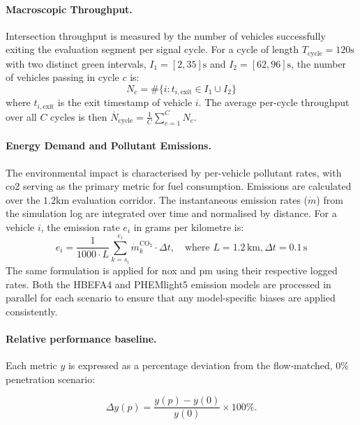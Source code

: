 \paragraph{Macroscopic Throughput.}
Intersection throughput is measured by the number of vehicles successfully exiting the evaluation segment per signal cycle. For a cycle of length $T_{\mathrm{cycle}}=120\unit{\second}$ with two distinct green intervals, $I_{1}=[2,35]\unit{\second}$ and $I_{2}=[62,96]\unit{\second}$, the number of vehicles passing in cycle $c$ is:
\begin{equation}
    N_{c} = \#\lbrace i : t_{i,\mathrm{exit}} \in I_{1} \cup I_{2} \rbrace
\end{equation}
where $t_{i,\mathrm{exit}}$ is the exit timestamp of vehicle $i$. The average per-cycle throughput over all $C$ cycles is then $\overline{N}_{\mathrm{cycle}} = \frac{1}{C}\sum_{c=1}^{C} N_{c}$.

\paragraph{Energy Demand and Pollutant Emissions.}
The environmental impact is characterised by per-vehicle pollutant rates, with \ac{co2} serving as the primary metric for fuel consumption. Emissions are calculated over the $1.2\unit{\kilo\meter}$ evaluation corridor. The instantaneous emission rates ($\dot{m}$) from the simulation log are integrated over time and normalised by distance. For a vehicle $i$, the emission rate $e_i$ in grams per kilometre is:
\begin{equation}
    e_{i} = \frac{1}{1000 \cdot L} \sum_{k=s_i}^{e_i} \dot{m}^{\mathrm{CO_2}}_{k} \cdot \Delta t, \quad \text{where } L = 1.2\,\mathrm{km}, \Delta t = 0.1\,\mathrm{s}
\end{equation}
The same formulation is applied for \ac{nox} and \ac{pm} using their respective logged rates. Both the HBEFA4 and PHEMlight5 emission models are processed in parallel for each scenario to ensure that any model-specific biases are applied consistently.

\paragraph{Relative performance baseline.}
Each metric $y$ is expressed as a percentage deviation from the flow‐matched, 0\% penetration scenario:

\begin{equation}
    \Delta y(p) = \frac{y(p) - y(0)}{y(0)} \times 100\%.
\end{equation}

